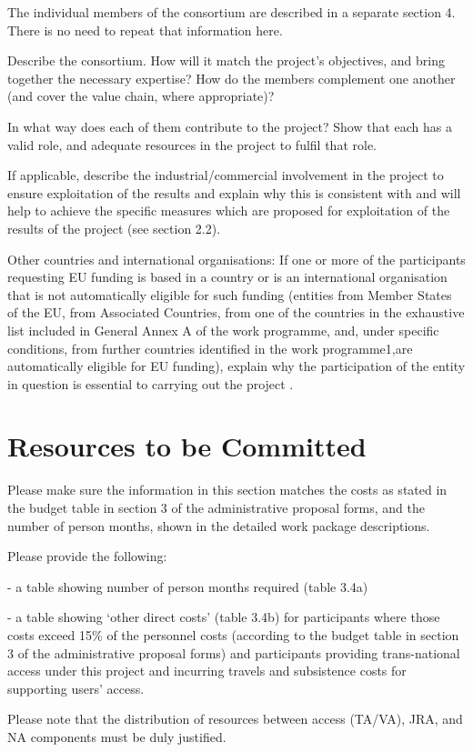\begin{todo}{}\color{red}

  The individual members of the consortium are described in a separate
  section 4. There is no need to repeat that information here.

  Describe the consortium. How will it match the project’s objectives, and bring together the necessary expertise? How do the members complement one another (and cover the value chain, where appropriate)? 

  In what way does each of them contribute to the project? Show that each has a valid role, and adequate resources in the project to fulfil that role. 

  If applicable, describe the industrial/commercial involvement in the project to ensure exploitation of the results and explain why this is consistent with and will help to achieve the specific measures which are proposed for exploitation of the results of the project (see section 2.2). 

  Other countries and international organisations: If one or more of the participants requesting EU funding is based in a country or is an international organisation that is not automatically eligible for such funding (entities from Member States of the EU, from Associated Countries, from one of the countries in the exhaustive list included in General Annex A of the work programme, and, under specific conditions, from further countries identified in the work programme1,are automatically eligible for EU funding), explain why the participation of the entity in question is essential to carrying out the project .
\end{todo}



\section{Resources to be Committed}\label{sec:resources}

\begin{todo}{}\color{red}
Please make sure the information in this section matches the costs as stated in the budget table in section 3 of the administrative proposal forms, and the number of person months, shown in the detailed work package descriptions.

Please provide the following:

- a table showing number of person months required (table 3.4a)

- a table showing ‘other direct costs’ (table 3.4b) for participants where those  costs exceed 15\% of the personnel costs (according to the budget  table in section 3 of the administrative proposal forms) and participants providing trans-national access under this project and incurring travels and subsistence costs for supporting users' access.

Please note that the distribution of resources between access (TA/VA), JRA, and NA components must be duly justified.
\end{todo}

